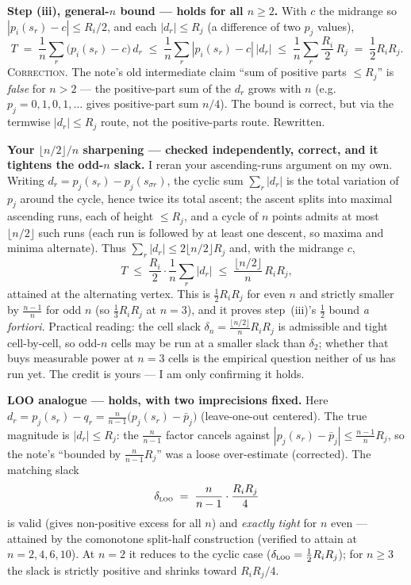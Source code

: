 \documentclass[11pt,a4paper]{article}
\begin{document}
\medskip

\noindent\textbf{Step (iii), general-$n$ bound --- holds for all $n \ge 2$.}
With $c$ the midrange so $|p_i(s_r) - c| \le R_i/2$, and each
$|d_r| \le R_j$ (a difference of two $p_j$ values),
\[
  T \;=\; \frac1n \sum_r \big(p_i(s_r) - c\big)\, d_r
  \;\le\; \frac1n \sum_r |p_i(s_r) - c|\,|d_r|
  \;\le\; \frac1n \sum_r \frac{R_i}{2}\, R_j
  \;=\; \frac12 R_i R_j .
\]
\textsc{Correction.} The note's old intermediate claim ``sum of positive parts
$\le R_j$'' is \emph{false} for $n > 2$ --- the positive-part sum of the $d_r$
grows with $n$ (e.g.\ $p_j = 0,1,0,1,\dots$ gives positive-part sum $n/4$). The
bound is correct, but via the termwise $|d_r| \le R_j$ route, not the
positive-parts route. Rewritten.

\medskip
\noindent\textbf{Your $\lfloor n/2\rfloor/n$ sharpening --- checked independently, correct, and it tightens the odd-$n$ slack.} I reran your ascending-runs argument on my own. Writing $d_r = p_j(s_r)-p_j(s_{\sigma r})$, the cyclic sum $\sum_r |d_r|$ is the total variation of $p_j$ around the cycle, hence twice its total ascent; the ascent splits into maximal ascending runs, each of height $\le R_j$, and a cycle of $n$ points admits at most $\lfloor n/2\rfloor$ such runs (each run is followed by at least one descent, so maxima and minima alternate). Thus $\sum_r|d_r|\le 2\lfloor n/2\rfloor R_j$ and, with the midrange $c$,
\[
  T \;\le\; \frac{R_i}{2}\cdot\frac1n\sum_r|d_r| \;\le\; \frac{\lfloor n/2\rfloor}{n}\,R_i R_j,
\]
attained at the alternating vertex. This is $\tfrac12 R_iR_j$ for even $n$ and strictly smaller by $\tfrac{n-1}{n}$ for odd $n$ (so $\tfrac13 R_iR_j$ at $n=3$), and it proves step~(iii)'s $\tfrac12$ bound \emph{a fortiori}. Practical reading: the cell slack $\delta_n=\tfrac{\lfloor n/2\rfloor}{n}R_iR_j$ is admissible and tight cell-by-cell, so odd-$n$ cells may be run at a smaller slack than $\delta_2$; whether that buys measurable power at $n=3$ cells is the empirical question neither of us has run yet. The credit is yours --- I am only confirming it holds.

\medskip
\noindent\textbf{LOO analogue --- holds, with two imprecisions fixed.} Here
$d_r = p_j(s_r) - q_r = \tfrac{n}{n-1}\big(p_j(s_r) - \bar p_j\big)$
(leave-one-out centered). The true magnitude is $|d_r| \le R_j$: the
$\tfrac{n}{n-1}$ factor cancels against
$|p_j(s_r) - \bar p_j| \le \tfrac{n-1}{n} R_j$, so the note's
``bounded by $\tfrac{n}{n-1} R_j$'' was a loose over-estimate (corrected). The
matching slack
\[
  \delta_{\textsc{loo}} \;=\; \frac{n}{n-1}\cdot \frac{R_i R_j}{4}
\]
is valid (gives non-positive excess for all $n$) and \emph{exactly tight} for
$n$ even --- attained by the comonotone split-half construction (verified to
attain at $n = 2, 4, 6, 10$). At $n = 2$ it reduces to the cyclic case
($\delta_{\textsc{loo}} = \tfrac12 R_i R_j$); for $n \ge 3$ the slack is
strictly positive and shrinks toward $R_i R_j / 4$.
\end{document}
